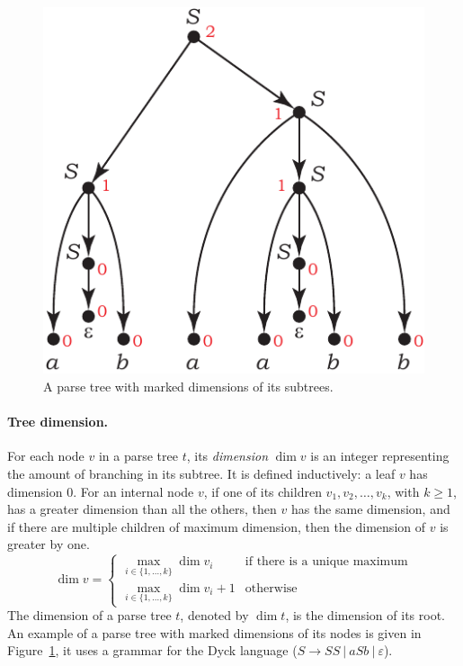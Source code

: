 \documentclass[runningheads]{llncs}
\renewcommand{\epsilon}{\varepsilon}
\begin{document}
\begin{figure}[t]
\centering
\includegraphics[scale=0.9]{tree_dimension_example}
\caption{A parse tree with marked dimensions of its subtrees.}
\label{f:tree_dimension_example}
\end{figure}

\paragraph{Tree dimension.} 
For each node $v$ in a parse tree $t$,
its \emph{dimension} $\dim v$ is an integer
representing the amount of branching in its subtree.
It is defined inductively: %
a leaf $v$ has dimension $0$.
For an internal node $v$, if one of its children $v_1, v_2, \ldots, v_k$, with $k \geqslant 1$,
has a greater dimension than all the others,
then $v$ has the same dimension,
and if there are multiple children of maximum dimension,
then the dimension of $v$ is greater by one.
\begin{equation*}
	\dim v
		=
	\begin{cases}
	\max_{i \in \{1, \ldots, k\}} \dim v_i
		&\text{if there is a unique maximum} \\
	\max_{i \in \{1, \ldots, k\}} \dim v_i +1
		&\text{otherwise}
	\end{cases}
\end{equation*}
The dimension of a parse tree $t$, denoted by $\dim t$, is the dimension of its root.
An example of a parse tree with marked dimensions of its nodes
is given in Figure~\ref{f:tree_dimension_example},
it uses a grammar for the Dyck language ($S \to SS \ | \ aSb \ | \ \epsilon$).
\end{document}
